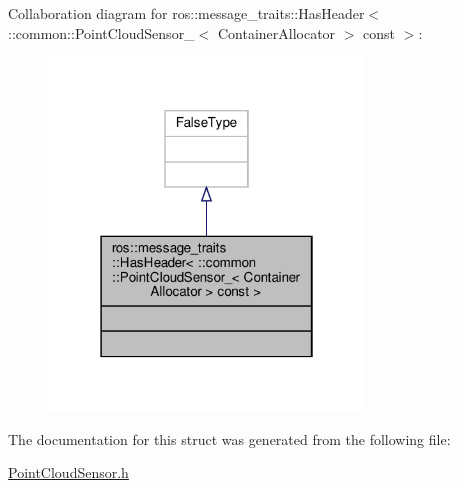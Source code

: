 Collaboration diagram for ros\+:\+:message\+\_\+traits\+:\+:Has\+Header$<$ \+:\+:common\+:\+:Point\+Cloud\+Sensor\+\_\+$<$ Container\+Allocator $>$ const $>$\+:\nopagebreak
\begin{figure}[H]
\begin{center}
\leavevmode
\includegraphics[width=238pt]{dd/da5/structros_1_1message__traits_1_1HasHeader_3_01_1_1common_1_1PointCloudSensor___3_01ContainerAllof58a7003169cc1c906d6eb5bcaf311af}
\end{center}
\end{figure}


The documentation for this struct was generated from the following file\+:\begin{DoxyCompactItemize}
\item 
\hyperlink{PointCloudSensor_8h}{Point\+Cloud\+Sensor.\+h}\end{DoxyCompactItemize}
